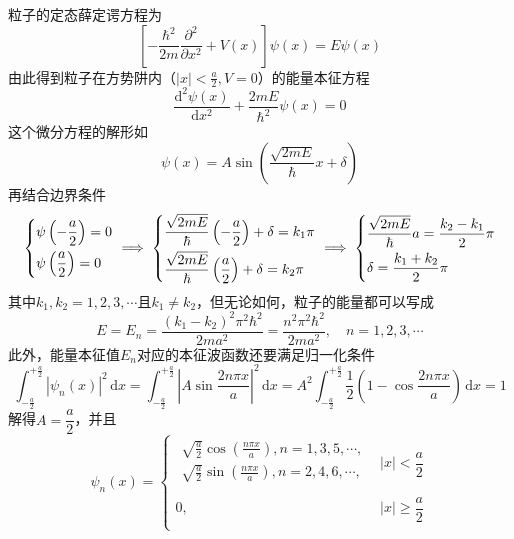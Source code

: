 \begin{solution}
    粒子的定态薛定谔方程为
    $$
        \left[-\frac{\hbar^2}{2m}\frac{\partial^2}{\partial x^2}+V(x)\right]\psi(x) = E\psi(x)
    $$
    由此得到粒子在方势阱内（$|x|<\frac{a}{2}, V=0$）的能量本征方程
    $$
        \frac{\mathrm{d}^2\psi(x)}{\mathrm{d}x^2}+\frac{2mE}{\hbar^2}\psi(x)=0
    $$
    这个微分方程的解形如
    $$
        \psi(x)=A\sin\left(\frac{\sqrt{2mE}}{\hbar}x+\delta\right)
    $$
    再结合边界条件
    $$
        \begin{dcases}
            \psi\left(-\frac{a}{2}\right) = 0 \\
            \psi\left(\frac{a}{2}\right) = 0
        \end{dcases}
        \implies
        \begin{dcases}
            \frac{\sqrt{2mE}}{\hbar}\left(-\frac{a}{2}\right)+\delta=k_1\pi \\
            \frac{\sqrt{2mE}}{\hbar}\left(\frac{a}{2}\right)+\delta=k_2\pi
        \end{dcases}
        \implies
        \begin{dcases}
            \frac{\sqrt{2mE}}{\hbar}a=\frac{k_2-k_1}{2}\pi \\
            \delta=\frac{k_1+k_2}{2}\pi
        \end{dcases}
    $$
    其中$k_1,k_2 = 1, 2, 3, \cdots$且$k_1\neq k_2$，但无论如何，粒子的能量都可以写成
    $$
        E=E_n=\frac{(k_1-k_2)^2\pi^2\hbar^2}{2ma^2}
        =\frac{n^2\pi^2\hbar^2}{2ma^2}, \quad n=1, 2, 3, \cdots
    $$
    此外，能量本征值$E_n$对应的本征波函数还要满足归一化条件
    $$
        \int_{-\frac{a}{2}}^{+\frac{a}{2}}|\psi_n(x)|^2\,\mathrm{d}x
        = \int_{-\frac{a}{2}}^{+\frac{a}{2}}\left|A\sin\frac{2n\pi x}{a}\right|^2\,\mathrm{d}x
        = A^2\int_{-\frac{a}{2}}^{+\frac{a}{2}}\frac{1}{2}\left(1-\cos\frac{2n\pi x}{a}\right)\,\mathrm{d}x
        = 1
    $$
    解得$A=\dfrac{a}{2}$，并且 %
    $$
        \psi_n(x) = \begin{cases}
            \begin{aligned}
                \sqrt{\frac{a}{2}}\cos\left(\frac{n\pi x}{a}\right), n=1,3,5,\cdots, \\
                \sqrt{\frac{a}{2}}\sin\left(\frac{n\pi x}{a}\right), n=2,4,6,\cdots, \\
            \end{aligned}
               & |x|<\dfrac{a}{2}         \\

            0, & |x|\geqslant\dfrac{a}{2} \\
        \end{cases}
    $$
\end{solution}





